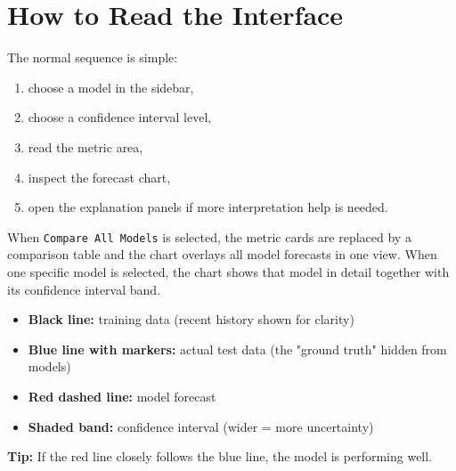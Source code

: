 \section{How to Read the Interface}

The normal sequence is simple:

\begin{enumerate}
    \item choose a model in the sidebar,
    \item choose a confidence interval level,
    \item read the metric area,
    \item inspect the forecast chart,
    \item open the explanation panels if more interpretation help is needed.
\end{enumerate}

When \texttt{Compare All Models} is selected, the metric cards are replaced by a comparison table and the chart overlays all model forecasts in one view. When one specific model is selected, the chart shows that model in detail together with its confidence interval band.

\begin{tcolorbox}[colback=purple!5!white, colframe=purple!75!black, title=Dashboard Reading Tips]
\begin{itemize}
    \item \textbf{Black line:} training data (recent history shown for clarity)
    \item \textbf{Blue line with markers:} actual test data (the "ground truth" hidden from models)
    \item \textbf{Red dashed line:} model forecast
    \item \textbf{Shaded band:} confidence interval (wider = more uncertainty)
\end{itemize}
\textbf{Tip:} If the red line closely follows the blue line, the model is performing well.
\end{tcolorbox}
